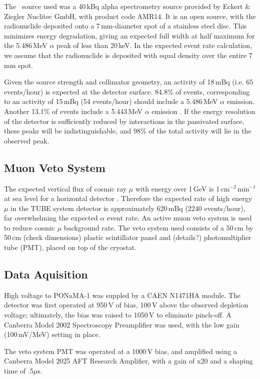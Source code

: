 \documentclass[groupedaddress,rmp,amsmath,amssymb,bibnotes,altaffilletter,twocolumn]{revtex4-1}
\begin{document}
The \am\ source used was a 40\,kBq alpha spectrometry source provided by Eckert \& Ziegler Nuclitec GmbH, with product code AMR14. It is an open source, with the radionuclide deposited onto a 7\,mm-diameter spot of a stainless steel disc. This minimizes energy degradation, giving an expected full width at half maximum for the 5.486\,MeV $\alpha$ peak of less than 20\,keV. In the expected event rate calculation, we assume that the radionuclide is deposited with equal density over the entire 7\,mm spot.

Given the source strength and collimator geometry, an activity of 18\,mBq (i.e. 65 events/hour) is expected at the detector surface. 84.8\% of events, corresponding to an activity of 15\,mBq (54 events/hour) should include a 5.486\,MeV $\alpha$ emission. Another 13.1\% of events include a 5.443\,MeV $\alpha$ emission \cite{nudat}. If the energy resolution of the detector is sufficiently reduced by interactions in the passivated surface, these peaks will be indistinguishable, and 98\% of the total activity will lie in the observed peak. 

\subsection{Muon Veto System}
The expected vertical flux of cosmic ray $\mu$ with energy over 1\,GeV is 1\,cm$^{-2}$\,min$^{-1}$ at sea level for a horizontal detector \cite{PDG2016}. Therefore the expected rate of high energy $\mu$ in the TUBE system detector is approximately 620\,mBq (2240 events/hour), far overwhelming the expected $\alpha$ event rate. An active muon veto system is used to reduce cosmic $\mu$ background rate. The veto system used consists of a 50\,cm by 50\,cm (check dimensions) plastic scintillator panel and (details?) photomultiplier tube (PMT), placed on top of the cryostat. 

\subsection{Data Aquisition}
High voltage to PONaMA-1 was suppled by a CAEN N1471HA module. The detector was first operated at 950\,V of bias, 100\,V above the observed depletion voltage; ultimately, the bias was raised to 1050\,V to eliminate pinch-off. A Canberra Model 2002 Spectroscopy Preamplifier was used, with the low gain (100\,mV/MeV) setting in place. 

The veto system PMT was operated at a 1000\,V bias, and amplified using a Canberra Model 2025 AFT Research Amplifier, with a gain of x20 and a shaping time of .5$\mu$s. 
\end{document}
